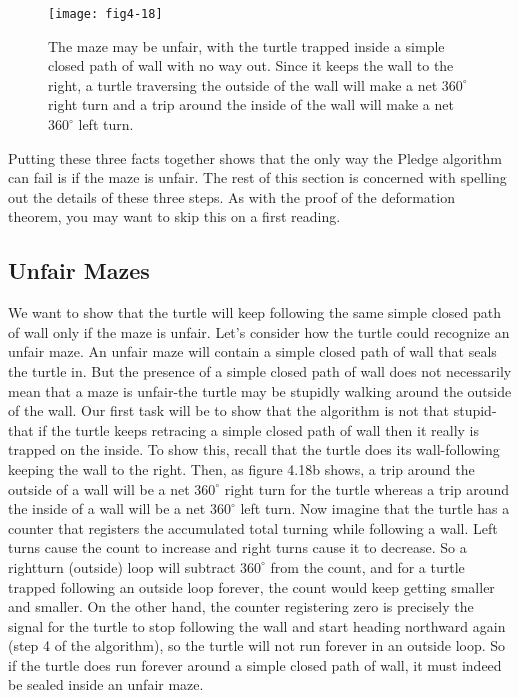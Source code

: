 \documentclass{book}
\begin{document}
\begin{figure}
\begin{center}
\texttt{[image: fig4-18]}
\caption{The maze may be unfair, with the turtle trapped inside a simple closed path of wall with no way out. Since it keeps the wall to the right, a turtle traversing the outside of the wall will make a net $360^{\circ}$ right turn and a trip around the inside of the wall will make a net $360^{\circ}$ left turn.}
\end{center}
\end{figure}

Putting these three facts together shows that the only way the Pledge
algorithm can fail is if the maze is unfair. The rest of this section is
concerned with spelling out the details of these three steps. As with the
proof of the deformation theorem, you may want to skip this on a first
reading.

\subsection{Unfair Mazes}

We want to show that the turtle will keep following the same simple
closed path of wall only if the maze is unfair. Let's consider how the
turtle could recognize an unfair maze. An unfair maze will contain a
simple closed path of wall that seals the turtle in. But the presence of
a simple closed path of wall does not necessarily mean that a maze is
unfair-the turtle may be stupidly walking around the outside of the
wall. Our first task will be to show that the algorithm is not that
stupid-that if the turtle keeps retracing a simple closed path of wall
then it really is trapped on the inside. To show this, recall that the turtle
does its wall-following keeping the wall to the right. Then, as figure
4.18b shows, a trip around the outside of a wall will be a net $360^{\circ}$ right
turn for the turtle whereas a trip around the inside of a wall will be a net
$360^{\circ}$ left turn. Now imagine that the turtle has a counter that registers
the accumulated total turning while following a wall. Left turns cause
the count to increase and right turns cause it to decrease. So a rightturn (outside) loop will subtract $360^{\circ}$ from the count, and for a turtle
trapped following an outside loop forever, the count would keep getting
smaller and smaller. On the other hand, the counter registering zero is
precisely the signal for the turtle to stop following the wall and start
heading northward again (step 4 of the algorithm), so the turtle will not
run forever in an outside loop. So if the turtle does run forever around
a simple closed path of wall, it must indeed be sealed inside an unfair
maze.
\end{document}
